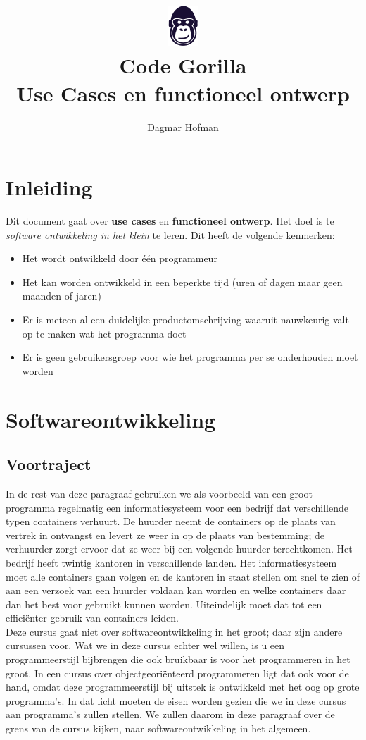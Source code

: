 \documentclass{article}
\title{ \includegraphics[scale=1]{gorilla.png} \\ Code Gorilla \\ Use Cases en functioneel ontwerp}
\author{Dagmar Hofman}
\date{}
\begin{document}
	\maketitle
	\newpage
	\tableofcontents
	\newpage
	\section{Inleiding}
	Dit document gaat over \textbf{use cases} en  \textbf{functioneel ontwerp}. Het doel is te \textit{software ontwikkeling in het klein} te leren. Dit heeft de volgende kenmerken: \\
	\begin{itemize}
		\item Het wordt ontwikkeld door \'{e}\'{e}n programmeur
		\item Het kan worden ontwikkeld in een beperkte tijd (uren of dagen maar geen maanden of jaren)
		\item Er is meteen al een duidelijke productomschrijving waaruit nauwkeurig valt op te maken wat het programma doet
		\item Er is geen gebruikersgroep voor wie het programma per se onderhouden moet worden
	\end{itemize}

	\section{Softwareontwikkeling}
	
	\subsection{Voortraject}
	
	In de rest van deze paragraaf gebruiken we als voorbeeld van een groot programma regelmatig een informatiesysteem voor een bedrijf dat verschillende typen containers verhuurt. De huurder neemt de containers op de plaats van vertrek in ontvangst en levert ze weer in op de plaats van bestemming; de verhuurder zorgt ervoor dat ze weer bij een volgende huurder terechtkomen. Het bedrijf heeft twintig kantoren in verschillende landen. Het informatiesysteem moet alle containers gaan volgen en de kantoren in staat stellen om snel te zien of aan een verzoek van een huurder voldaan kan worden en welke containers daar dan het best voor gebruikt kunnen worden. Uiteindelijk moet dat tot een efficiënter gebruik van containers leiden. \\
	Deze cursus gaat niet over softwareontwikkeling in het groot; daar zijn andere cursussen voor. Wat we in deze cursus echter wel willen, is u een programmeerstijl bijbrengen die ook bruikbaar is voor het programmeren in het groot. In een cursus over objectgeoriënteerd programmeren ligt dat ook voor de hand, omdat deze programmeerstijl bij uitstek is ontwikkeld met het oog op grote programma’s. In dat licht moeten de eisen worden gezien die we in deze cursus aan programma’s zullen 	stellen. We zullen daarom in deze paragraaf over de grens van de cursus kijken, naar softwareontwikkeling in het algemeen. \\
	
\end{document}
